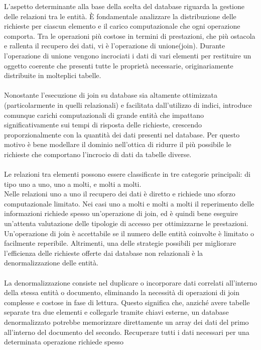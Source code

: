 L'aspetto determinante alla base della scelta del database
riguarda la gestione delle relazioni tra le entità.
È fondamentale analizzare la distribuzione delle richieste per ciascun elemento
e il carico computazionale che ogni operazione comporta.
Tra le operazioni più costose in termini di prestazioni,
che più ostacola e rallenta il recupero dei dati, vi è l'operazione di unione(join).
Durante l'operazione di unione vengono incrociati i dati di vari elementi
per restituire un oggetto coerente che presenti tutte le proprietà necessarie,
originariamente distribuite in molteplici tabelle. \\
\\
Nonostante l'esecuzione di join su database sia altamente ottimizzata
(particolarmente in quelli relazionali) e facilitata dall'utilizzo di indici,
introduce comunque carichi computazionali di grande entità che impattano
significativamente sui tempi di risposta delle richieste,
crescendo proporzionalmente con la quantità dei dati presenti nel database.
Per questo motivo è bene modellare il dominio nell'ottica di ridurre il più possibile
le richieste che comportano l'incrocio di dati da tabelle diverse.\\
\\
Le relazioni tra elementi possono essere classificate in tre categorie principali:
di tipo uno a uno, uno a molti, e molti a molti. \\
Nelle relazioni uno a uno il recupero dei dati è diretto
e richiede uno sforzo computazionale limitato.
Nei casi uno a molti e molti a molti il reperimento delle informazioni richiede
spesso un'operazione di join, ed è quindi bene eseguire un'attenta valutazione
delle tipologie di accesso per ottimizzarne le prestazioni.
Un'operazione di join è accettabile se il numero delle entità coinvolte è limitato o facilmente reperibile.
Altrimenti, una delle strategie possibili per migliorare l’efficienza delle richieste
offerte dai database non relazionali è la denormalizzazione delle entità.\\
\\
La denormalizzazione consiste nel duplicare o incorporare dati correlati all'interno della stessa entità o documento,
eliminando la necessità di operazioni di join complesse e costose in fase di lettura.
Questo significa che, anziché avere tabelle separate tra due elementi e collegarle tramite chiavi esterne,
un database denormalizzato potrebbe memorizzare direttamente
un array dei dati del primo all'interno del documento del secondo.
Recuperare tutti i dati necessari per una determinata operazione richiede spesso
